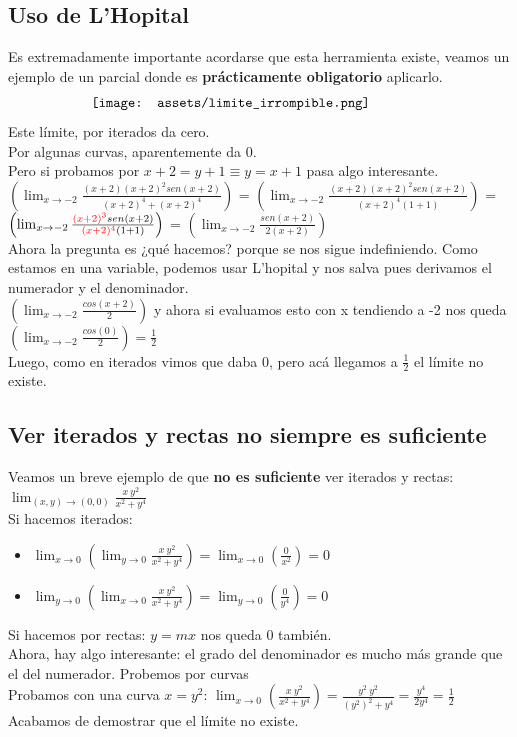 \documentclass[10pt,a4paper]{article}
\begin{document}
\subsection*{Uso de L'Hopital}
Es extremadamente importante acordarse que esta herramienta existe, veamos un ejemplo de un parcial donde es \textbf{prácticamente obligatorio} aplicarlo. 
\[\begin{minipage}[b]{0.7\textwidth}
    \texttt{[image: assets/limite\_irrompible.png]}
\end{minipage}\]
Este límite, por iterados da cero. \\
Por algunas curvas, aparentemente da 0. \\
Pero si probamos por $x+2 = y+1 \equiv y=x+1$ pasa algo interesante. \\
$\left( \lim_{x \to -2} \frac{(x+2)(x+2)^{2}sen(x+2)}{(x+2)^{4}+(x+2)^{4}} \right)$ = $\left( \lim_{x \to -2} \frac{(x+2)(x+2)^{2}sen(x+2)}{(x+2)^{4}(1+1)} \right)$ = $\left( \lim_{x \to -2} \frac{\textcolor{red}{(x+2)^{3}}sen(x+2)}{\textcolor{red}{(x+2)^{4}}(1+1)} \right)$ = $\left( \lim_{x \to -2} \frac{sen(x+2)}{2 (x+2)} \right)$ \\
Ahora la pregunta es ¿qué hacemos? porque se nos sigue indefiniendo. Como estamos en una variable, podemos usar L'hopital y nos salva pues derivamos el numerador y el denominador. \\
$\left( \lim_{x \to -2} \frac{cos(x+2)}{2} \right)$ y ahora si evaluamos esto con x tendiendo a -2 nos queda  $\left( \lim_{x \to -2} \frac{cos(0)}{2} \right) = \frac{1}{2}$ \\
Luego, como en iterados vimos que daba 0, pero acá llegamos a $\frac{1}{2}$ el límite no existe. 
\subsection*{Ver iterados y rectas no siempre es suficiente}
Veamos un breve ejemplo de que \textbf{no es suficiente} ver iterados y rectas: $\lim_{(x,y) \to (0,0)} \frac{x \ y^2}{x^2+y^4}$ \\
Si hacemos iterados: 
\begin{itemize}
\item $\lim_{x \to 0} \left( \lim_{y \to 0} \frac{x \ y^2}{x^2+y^4} \right) = \lim_{x \to 0} (\frac{0}{x^{2}}) = 0$
\item $\lim_{y \to 0} \left( \lim_{x \to 0} \frac{x \ y^2}{x^2+y^4} \right) = \lim_{y \to 0}(\frac{0}{y^{4}}) = 0$
\end{itemize}
Si hacemos por rectas: $y=mx$ nos queda 0 también. \\
Ahora, hay algo interesante: el grado del denominador es mucho más grande que el del numerador. Probemos por curvas \\
Probamos con una curva $x = y^{2}$: $\lim_{x \to 0} \left(\frac{x \ y^2}{x^2+y^4} \right) = \frac{y^{2} \ y^2}{(y^{2})^2+y^4} = \frac{y^{4}}{2y^{4}} = \frac{1}{2}  $ \\
Acabamos de demostrar que el límite no existe. 
\end{document}
